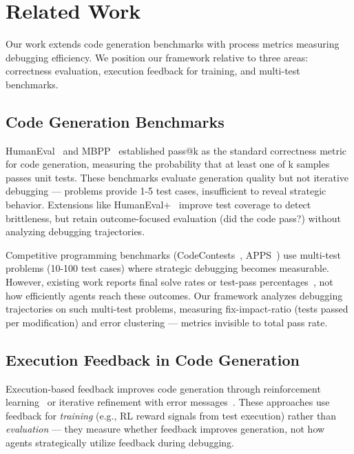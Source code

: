 \section{Related Work}

Our work extends code generation benchmarks with process metrics measuring debugging efficiency. We position our framework relative to three areas: correctness evaluation, execution feedback for training, and multi-test benchmarks.

\subsection{Code Generation Benchmarks}

HumanEval~\cite{Chen2021Evaluating} and MBPP~\cite{Austin2021Program} established pass@k as the standard correctness metric for code generation, measuring the probability that at least one of k samples passes unit tests. These benchmarks evaluate generation quality but not iterative debugging — problems provide 1-5 test cases, insufficient to reveal strategic behavior. Extensions like HumanEval+~\cite{Liu2023Is} improve test coverage to detect brittleness, but retain outcome-focused evaluation (did the code pass?) without analyzing debugging trajectories.

Competitive programming benchmarks (CodeContests~\cite{Li2022Competition}, APPS~\cite{Hendrycks2021Measuring}) use multi-test problems (10-100 test cases) where strategic debugging becomes measurable. However, existing work reports final solve rates or test-pass percentages~\cite{Jain2024LiveCodeBench}, not how efficiently agents reach these outcomes. Our framework analyzes debugging trajectories on such multi-test problems, measuring fix-impact-ratio (tests passed per modification) and error clustering — metrics invisible to total pass rate.

\subsection{Execution Feedback in Code Generation}

Execution-based feedback improves code generation through reinforcement learning~\cite{Le2022CodeRL} or iterative refinement with error messages~\cite{Chen2023Teaching}. These approaches use feedback for \emph{training} (e.g., RL reward signals from test execution) rather than \emph{evaluation} — they measure whether feedback improves generation, not how agents strategically utilize feedback during debugging.

